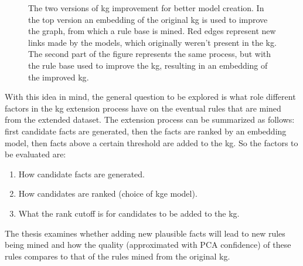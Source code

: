 \begin{figure}[htp]
    \centering
    
    \caption[Figure representing the process.]{The two versions of \gls{kg} improvement for better model creation. In the top version an embedding of the original \gls{kg} is used to improve the graph, from which a rule base is mined. Red edges represent new links made by the models, which originally weren't present in the \gls{kg}. The second part of the figure represents the same process, but with the rule base used to improve the \gls{kg}, resulting in an embedding of the improved \gls{kg}.}
    \label{rule_based_and_embedding}
\end{figure}

With this idea in mind, the general question to be explored is what role different factors in the \gls{kg} extension process have on the eventual rules that are mined from the extended dataset. The extension process can be summarized as follows: first candidate facts are generated, then the facts are ranked by an embedding model, then facts above a certain threshold are added to the \gls{kg}. So the factors to be evaluated are:
\begin{enumerate}
    \item How candidate facts are generated.
    \item How candidates are ranked (choice of \gls{kge} model).
    \item What the rank cutoff is for candidates to be added to the \gls{kg}.
\end{enumerate}

The thesis examines whether adding new plausible facts will lead to new rules being mined and how the quality (approximated with PCA confidence) of these rules compares to that of the rules mined from the original \gls{kg}.



